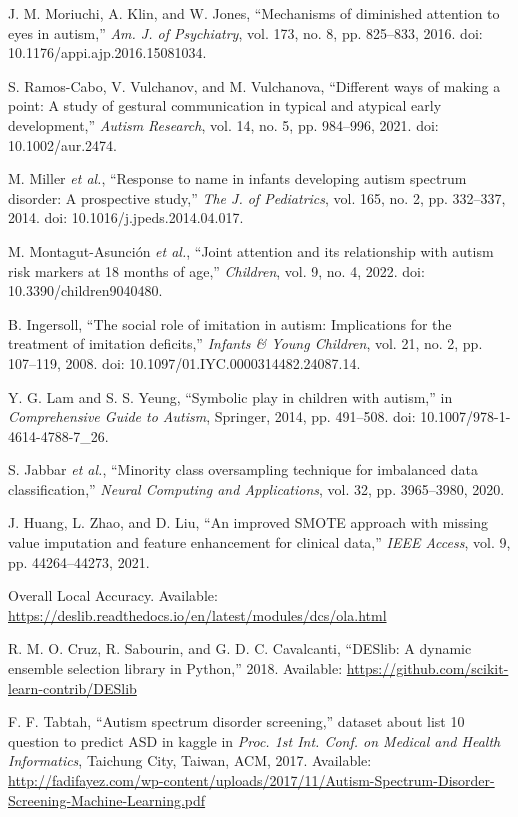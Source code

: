 \documentclass[conference]{IEEEtran}
\begin{document}
\begin{thebibliography}{99}
 J. M. Moriuchi, A. Klin, and W. Jones, ``Mechanisms of diminished attention to eyes in autism,'' \textit{Am. J. of Psychiatry}, vol. 173, no. 8, pp. 825--833, 2016. doi: 10.1176/appi.ajp.2016.15081034.

 S. Ramos-Cabo, V. Vulchanov, and M. Vulchanova, ``Different ways of making a point: A study of gestural communication in typical and atypical early development,'' \textit{Autism Research}, vol. 14, no. 5, pp. 984--996, 2021. doi: 10.1002/aur.2474.

 M. Miller \textit{et al.}, ``Response to name in infants developing autism spectrum disorder: A prospective study,'' \textit{The J. of Pediatrics}, vol. 165, no. 2, pp. 332--337, 2014. doi: 10.1016/j.jpeds.2014.04.017.

 M. Montagut-Asunción \textit{et al.}, ``Joint attention and its relationship with autism risk markers at 18 months of age,'' \textit{Children}, vol. 9, no. 4, 2022. doi: 10.3390/children9040480.

 B. Ingersoll, ``The social role of imitation in autism: Implications for the treatment of imitation deficits,'' \textit{Infants \& Young Children}, vol. 21, no. 2, pp. 107--119, 2008. doi: 10.1097/01.IYC.0000314482.24087.14.

 Y. G. Lam and S. S. Yeung, ``Symbolic play in children with autism,'' in \textit{Comprehensive Guide to Autism}, Springer, 2014, pp. 491--508. doi: 10.1007/978-1-4614-4788-7\_26.

 S. Jabbar \textit{et al.}, ``Minority class oversampling technique for imbalanced data classification,'' \textit{Neural Computing and Applications}, vol. 32, pp. 3965--3980, 2020.

 J. Huang, L. Zhao, and D. Liu, ``An improved SMOTE approach with missing value imputation and feature enhancement for clinical data,'' \textit{IEEE Access}, vol. 9, pp. 44264--44273, 2021.

 Overall Local Accuracy. Available: \url{https://deslib.readthedocs.io/en/latest/modules/dcs/ola.html}

 R. M. O. Cruz, R. Sabourin, and G. D. C. Cavalcanti, ``DESlib: A dynamic ensemble selection library in Python,'' 2018. Available: \url{https://github.com/scikit-learn-contrib/DESlib}

 F. F. Tabtah, ``Autism spectrum disorder screening,'' dataset about list 10 question to predict ASD in kaggle in \textit{Proc. 1st Int. Conf. on Medical and Health Informatics}, Taichung City, Taiwan, ACM, 2017. Available: \url{http://fadifayez.com/wp-content/uploads/2017/11/Autism-Spectrum-Disorder-Screening-Machine-Learning.pdf}

\end{thebibliography}
\end{document}
